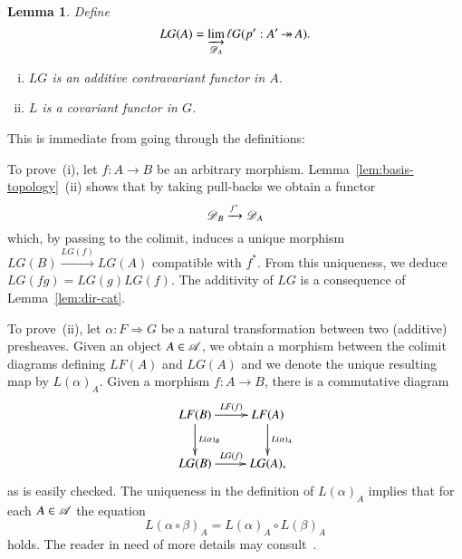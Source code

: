 \documentclass[1p]{elsarticle}
\makeatletter
\renewenvironment{proof}[1][\proofname]{\par
  \pushQED{\qed}%
  \normalfont \topsep6\p@\@plus6\p@\relax
  \trivlist
  \item[\hskip\labelsep
        \scshape
    #1\@addpunct{.}]\ignorespaces
}{%
  \popQED\endtrivlist\@endpefalse
}
\theoremstyle{mythm}
\newtheorem{Lem}[Thm]{Lemma}
\theoremstyle{mydef}
\makeatother
\begin{document}
\begin{Lem}
  \label{lem:functoriality-L}
  Define
  \[
  LG(A) = \varinjlim_{\operatorname{\mathscr{D}}_{A}} \ell G(p':A' \operatorname{\twoheadrightarrow} A).
  \]
  \begin{enumerate}[(i)]
    \item
     $LG$ is an additive contravariant functor in $A$.
    \item
     $L$ is a covariant functor in $G$.
  \end{enumerate}
\end{Lem}
\begin{proof}
  This is immediate from going through the definitions:
  
  To prove~(i), let $f: A \to B$ be an arbitrary morphism. 
  Lemma~\ref{lem:basis-topology}~(ii) shows that by taking
  pull-backs we obtain a functor
  \[
  \operatorname{\mathscr{D}}_{B} \xrightarrow{f^{\ast}} \operatorname{\mathscr{D}}_{A}
  \]
  which, by passing to the colimit, induces a unique
  morphism $LG(B) \xrightarrow{LG(f)} LG(A)$
  compatible with $f^{\ast}$. 
  From this uniqueness, we deduce $LG(fg) = LG(g) LG(f)$. The
  additivity of $LG$ is a consequence of Lemma~\ref{lem:dir-cat}.
  
  To prove~(ii), let $\alpha: F \Rightarrow G$ be a natural
  transformation between two (additive) presheaves. Given an object
  $A \in \operatorname{\mathscr{A}}$, we obtain a morphism between the colimit
  diagrams defining $LF(A)$ and $LG(A)$ and we denote the unique resulting 
  map by $L(\alpha)_{A}$. Given a morphism
  $f: A \to B$, there is a commutative diagram
  \[
  \xymatrix{
    LF(B) \ar[d]^{L(\alpha)_{B}} \ar[r]^{LF(f)} &
    LF(A) \ar[d]^{L(\alpha)_{A}} \\
    LG(B) \ar[r]^{LG(f)} & LG(A),
  }
  \]
  as is easily checked. The uniqueness in the definition of
  $L(\alpha)_{A}$ implies that for each $A \in \operatorname{\mathscr{A}}$
  the equation
  \[
  L(\alpha \circ \beta)_{A} =
  L(\alpha)_{A} \circ L(\beta)_{A}
  \]
  holds. The reader in need of more
  details may consult~\cite[p.~206f]{MR1315049}.
\end{proof}
\end{document}
